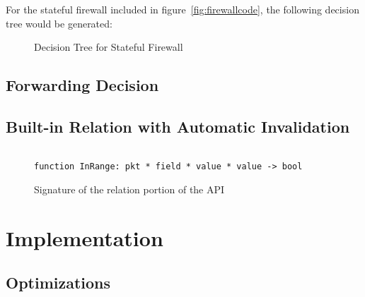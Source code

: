 \documentclass[12pt]{article}
\begin{document}
   
   

  For the stateful firewall included in figure~\ref{fig:firewallcode}, the following decision tree would be generated:


  \begin{figure}
\label{fig:decisiontree}  
\caption{Decision Tree for Stateful Firewall}     
\end{figure}
   

   

   \subsection*{Forwarding Decision}

   
   \subsection*{Built-in Relation with Automatic Invalidation}

   \begin{figure}
     \begin{lstlisting}
       
function InRange: pkt * field * value * value -> bool

\end{lstlisting}

\caption{Signature of the relation portion of the API}
\end{figure}

   
   
\section*{Implementation}

   \subsection*{Optimizations}
\end{document}
